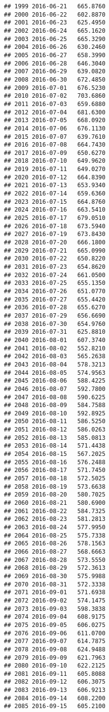 \documentclass[
]{article}
\begin{document}
\begin{verbatim}
## 1999 2016-06-21   665.8760
## 2000 2016-06-22   602.8870
## 2001 2016-06-23   625.4950
## 2002 2016-06-24   665.1620
## 2003 2016-06-25   665.3290
## 2004 2016-06-26   630.2460
## 2005 2016-06-27   658.3990
## 2006 2016-06-28   646.3040
## 2007 2016-06-29   639.0820
## 2008 2016-06-30   672.4850
## 2009 2016-07-01   676.5230
## 2010 2016-07-02   703.6860
## 2011 2016-07-03   659.6880
## 2012 2016-07-04   681.6300
## 2013 2016-07-05   668.0920
## 2014 2016-07-06   676.1130
## 2015 2016-07-07   639.7610
## 2016 2016-07-08   664.7430
## 2017 2016-07-09   650.6270
## 2018 2016-07-10   649.9620
## 2019 2016-07-11   649.0270
## 2020 2016-07-12   664.8390
## 2021 2016-07-13   653.9340
## 2022 2016-07-14   659.6360
## 2023 2016-07-15   664.8760
## 2024 2016-07-16   663.5410
## 2025 2016-07-17   679.0510
## 2026 2016-07-18   673.5940
## 2027 2016-07-19   673.8430
## 2028 2016-07-20   666.1800
## 2029 2016-07-21   665.0990
## 2030 2016-07-22   650.8220
## 2031 2016-07-23   654.8620
## 2032 2016-07-24   661.0500
## 2033 2016-07-25   655.1350
## 2034 2016-07-26   651.0770
## 2035 2016-07-27   655.4420
## 2036 2016-07-28   655.6270
## 2037 2016-07-29   656.6690
## 2038 2016-07-30   654.9760
## 2039 2016-07-31   625.8810
## 2040 2016-08-01   607.3740
## 2041 2016-08-02   552.8210
## 2042 2016-08-03   565.2638
## 2043 2016-08-04   578.3213
## 2044 2016-08-05   574.9563
## 2045 2016-08-06   588.4225
## 2046 2016-08-07   592.7800
## 2047 2016-08-08   590.6225
## 2048 2016-08-09   584.7588
## 2049 2016-08-10   592.8925
## 2050 2016-08-11   586.5250
## 2051 2016-08-12   586.0263
## 2052 2016-08-13   585.0813
## 2053 2016-08-14   571.4438
## 2054 2016-08-15   567.2025
## 2055 2016-08-16   576.2488
## 2056 2016-08-17   571.7450
## 2057 2016-08-18   572.5025
## 2058 2016-08-19   573.6638
## 2059 2016-08-20   580.7025
## 2060 2016-08-21   580.6900
## 2061 2016-08-22   584.7325
## 2062 2016-08-23   581.2813
## 2063 2016-08-24   577.9950
## 2064 2016-08-25   575.7338
## 2065 2016-08-26   578.1563
## 2066 2016-08-27   568.6663
## 2067 2016-08-28   573.5550
## 2068 2016-08-29   572.3613
## 2069 2016-08-30   575.9988
## 2070 2016-08-31   572.3338
## 2071 2016-09-01   571.6938
## 2072 2016-09-02   574.1475
## 2073 2016-09-03   598.3838
## 2074 2016-09-04   608.9175
## 2075 2016-09-05   606.0275
## 2076 2016-09-06   611.0700
## 2077 2016-09-07   614.7875
## 2078 2016-09-08   624.9488
## 2079 2016-09-09   621.7963
## 2080 2016-09-10   622.2125
## 2081 2016-09-11   605.8088
## 2082 2016-09-12   606.3075
## 2083 2016-09-13   606.9213
## 2084 2016-09-14   608.2200
## 2085 2016-09-15   605.2100

\end{verbatim}
\end{document}

